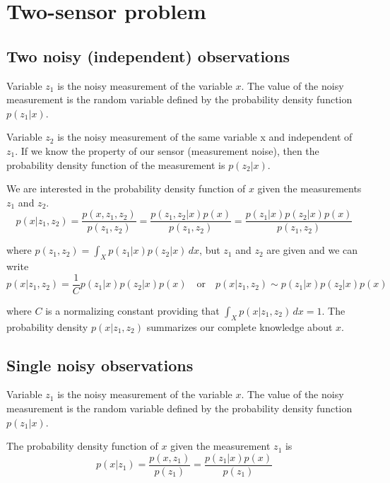 \section{Two-sensor problem}

\subsection{Two noisy (independent) observations}

Variable $z_1$ is the noisy measurement of the variable $x$. The value of the
noisy measurement is the random variable defined by the probability density
function $p(z_1|x)$.

Variable $z_2$ is the noisy measurement of the same variable x and independent
of $z_1$. If we know the property of our sensor (measurement noise), then the
probability density function of the measurement is $p(z_2|x)$.

We are interested in the probability density function of $x$ given the
measurements $z_1$ and $z_2$.
\begin{equation*}
  p(x|z_1, z_2) = \frac{p(x, z_1, z_2)}{p(z_1, z_2)}
                = \frac{p(z_1, z_2|x)p(x)}{p(z_1, z_2)}
                = \frac{p(z_1|x) p(z_2|x) p(x)}{p(z_1, z_2)}
\end{equation*}

where $p(z_1, z_2) = \int_X p(z_1|x) p(z_2|x) \,dx$, but $z_1$ and $z_2$ are
given and we can write
\begin{equation*}
  p(x|z_1, z_2) = \frac{1}{C} p(z_1|x) p(z_2|x) p(x) \quad \text{or} \quad
    p(x|z_1, z_2) \sim p(z_1|x) p(z_2|x) p(x)
\end{equation*}

where $C$ is a normalizing constant providing that
$\int_X p(x|z_1, z_2) \,dx = 1$. The probability density $p(x|z_1, z_2)$
summarizes our complete knowledge about $x$.

\subsection{Single noisy observations}

Variable $z_1$ is the noisy measurement of the variable $x$. The value of the
noisy measurement is the random variable defined by the probability density
function $p(z_1|x)$.

The probability density function of $x$ given the measurement $z_1$ is
\begin{equation*}
  p(x|z_1) = \frac{p(x, z_1)}{p(z_1)} = \frac{p(z_1|x) p(x)}{p(z_1)}
\end{equation*}

